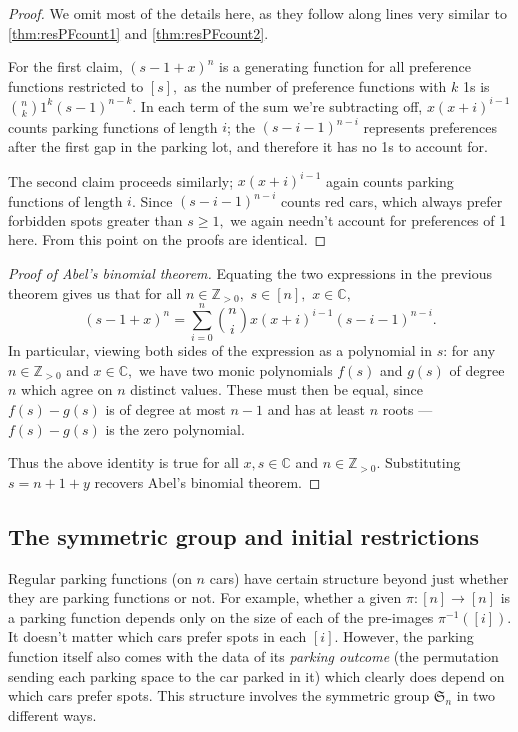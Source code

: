 \documentclass[12 pt]{amsart}
\theoremstyle{definition} %
\theoremstyle{remark} %
\begin{document}
\begin{proof}
    We omit most of the details here, as they follow along lines very similar to \cref{thm:resPFcount1} and \cref{thm:resPFcount2}.
    
    For the first claim, $(s-1+x)^n$ is a generating function for all preference functions restricted to $[s],$ as the number of preference functions with $k$ 1s is $\binom{n}{k}1^k(s-1)^{n-k}.$ In each term of the sum we're subtracting off, $x(x+i)^{i-1}$  counts parking functions of length $i$; the $(s-i-1)^{n-i}$ represents preferences after the first gap in the parking lot, and therefore it has no 1s to account for.

    The second claim proceeds similarly; $x(x+i)^{i-1}$ again counts parking functions of length $i$. Since $(s-i-1)^{n-i}$ counts red cars, which always prefer forbidden spots greater than $s\ge1,$ we again needn't account for preferences of 1 here. From this point on the proofs are identical.
\end{proof}

\begin{proof}[Proof of Abel's binomial theorem]
	Equating the two expressions in the previous theorem gives us that for all $n\in\mathbb{Z}_{>0},$ $s\in [n],$ $x\in\mathbb{C},$
	\[
		(s-1+x)^{n} = \sum_{i = 0}^{n} \binom{n}{i} x(x + i)^{i - 1} (s - i - 1)^{n - i}.
	\]
In particular, viewing both sides of the expression as a polynomial in $s$: for any $n\in\mathbb{Z}_{>0}$ and $x\in\mathbb{C},$ we have two monic polynomials $f(s)$ and $g(s)$ of degree $n$ which agree on $n$ distinct values. These must then be equal, since $f(s)-g(s)$ is of degree at most $n-1$ and has at least $n$ roots --- $f(s) - g(s)$ is the zero polynomial.

Thus the above identity is true for all $x,s\in\mathbb{C}$ and $n\in\mathbb{Z}_{>0}$. Substituting $s=n+1+y$ recovers Abel's binomial theorem.

\end{proof}

\subsection*{The symmetric group and initial restrictions}

Regular parking functions (on $n$ cars) have certain structure beyond just whether they are parking functions or not. For example, whether a given $\pi : [n] \to [n]$ is a parking function depends only on the size of each of the pre-images $\pi^{-1}([i])$. It doesn't matter which cars prefer spots in each $[i]$. However, the parking function itself also comes with the data of its \emph{parking outcome} (the permutation sending each parking space to the car parked in it) which clearly does depend on which cars prefer spots. This structure involves the symmetric group $\mathfrak{S}_{n}$ in two different ways.
\end{document}
